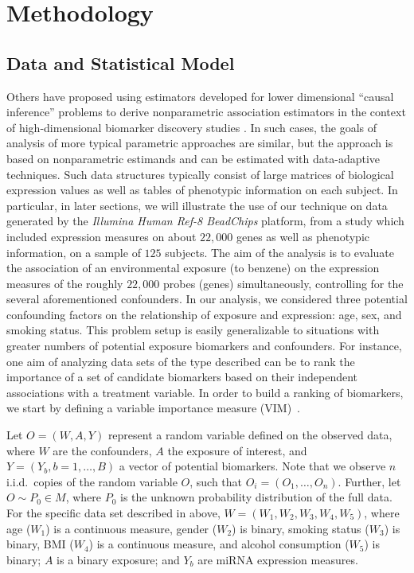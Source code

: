 \chapter{Methodology}

\section{Data and Statistical Model}\label{data}

Others have proposed using estimators developed for lower dimensional ``causal
inference'' problems to derive nonparametric association estimators in the
context of high-dimensional biomarker discovery studies
\cite{tuglus2011targeted}. In such cases, the goals of analysis of more typical
parametric approaches are similar, but the approach is based on nonparametric
estimands and can be estimated with data-adaptive techniques. Such data
structures typically consist of large matrices of biological expression values
as well as tables of phenotypic information on each subject. In particular, in
later sections, we will illustrate the use of our technique on data generated by
the \textit{Illumina Human Ref-8 BeadChips} platform, from a study which
included expression measures on about $22,000$ genes as well as phenotypic
information, on a sample of $125$ subjects. The aim of the analysis is to
evaluate the association of an environmental exposure (to benzene) on the
expression measures of the roughly $22,000$ probes (genes) simultaneously,
controlling for the several aforementioned confounders. In our analysis, we
considered three potential confounding factors on the relationship of exposure
and expression: age, sex, and smoking status. This problem setup is easily
generalizable to situations with greater numbers of potential exposure
biomarkers and confounders. For instance, one aim of analyzing data sets of the
type described can be to rank the importance of a set of candidate biomarkers
based on their independent associations with a treatment variable. In order to
build a ranking of biomarkers, we start by defining a variable importance
measure (VIM)~\cite{van2011targeted}.

Let $O = (W, A, Y)$ represent a random variable defined on the observed data,
where $W$ are the confounders, $A$ the exposure of interest, and
$Y = (Y_b, b = 1, \dots, B)$ a vector of potential biomarkers. Note that we
observe $n$ i.i.d.~copies of the random variable $O$, such that
$O_i = (O_1, \dots, O_n)$. Further, let $O \sim P_0 \in M$, where $P_{0}$ is the
unknown probability distribution of the full data. For the specific data set
described in above, $W = (W_{1}, W_{2}, W_{3}, W_{4}, W_{5})$, where age
($W_{1}$) is a continuous measure, gender ($W_{2}$) is binary, smoking status
($W_{3}$) is binary, BMI ($W_{4}$) is a continuous measure, and alcohol
consumption ($W_{5}$) is binary; $A$ is a binary exposure; and $Y_{b}$ are miRNA
expression measures.

